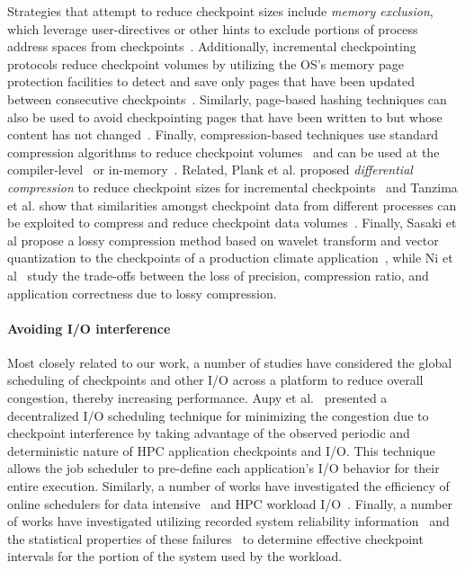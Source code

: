 \documentclass[conference,nofonttune]{IEEEtran}
\begin{document}
Strategies that attempt to reduce checkpoint sizes include \emph{memory
exclusion}, which leverage user-directives or other hints to exclude portions of
process address spaces from checkpoints~\cite{Plank99MemoryExclusion}.
Additionally, incremental checkpointing protocols reduce checkpoint volumes by
utilizing the OS's memory page protection facilities to detect and save only
pages that have been updated between consecutive
checkpoints~\cite{Bronevetsky09Compiler,
Chen97CLIP,Elnozahy92ConsistentCheckpointing,Li94ConcurrentCheckpointing,
Plank94Libckpt,Paun10IncrementalWeibull,Kiswany08stdchk}.  Similarly,
page-based hashing techniques can also be used to avoid checkpointing pages
that have been written to but whose content has not
changed~\cite{Ferreira11Libhashckpt}.  Finally, compression-based techniques
use standard compression algorithms to reduce checkpoint
volumes~\cite{Ibtesham12Compression} and can be used at the
compiler-level~\cite{Li90CATCH} or in-memory~\cite{Plank94ICKP}.  Related,
Plank et al. proposed \textit{differential compression} to reduce checkpoint
sizes for incremental checkpoints~\cite{Plank95CompressedDiff} and Tanzima et
al.  show that similarities amongst checkpoint data from different processes
can be exploited to compress and reduce checkpoint data
volumes~\cite{tanzima12mcrengine}.  Finally, Sasaki et al propose a lossy
compression method based on wavelet transform and vector quantization to the
checkpoints of a production climate application~\cite{sasaki2015}, while Ni et
al~\cite{Ni2014} study the trade-offs between the loss of precision, compression
ratio, and application correctness due to lossy compression.

\paragraph*{Avoiding I/O interference}

Most closely related to our work, a number of studies have considered the global
scheduling of checkpoints and other I/O across a platform to reduce overall
congestion, thereby increasing performance.  Aupy et al.~\cite{Aupy:2017:Periodic}
presented a decentralized I/O scheduling technique for minimizing the congestion due
to checkpoint interference by taking advantage of the observed periodic and
deterministic nature of HPC application checkpoints and I/O.  This technique allows
the job scheduler to pre-define each application’s I/O behavior for their entire
execution.  Similarly, a number of works have investigated the efficiency of online
schedulers for data intensive~\cite{Groot2013,Sim:2015:AnalyzeThis} and HPC workload
I/O~\cite{Dorier2015,Gainaru:2016:Scheduling,Zhou:2015:IOAware,Herbein2017}.
Finally, a number of works have investigated utilizing recorded system reliability
information~\cite{Oliner:2006:Cooperative} and the statistical properties of these
failures~\cite{Tiwari:2014:Lazy} to determine effective checkpoint intervals for the
portion of the system used by the workload.
\end{document}
